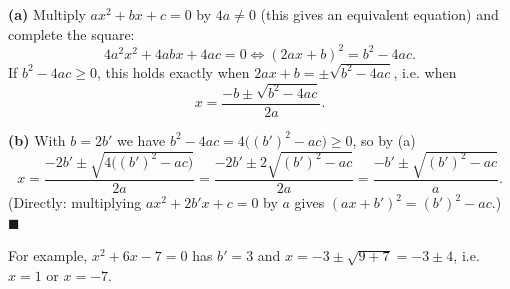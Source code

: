 \textbf{(a)} Multiply $ax^2+bx+c=0$ by $4a\ne0$ (this gives an equivalent equation) and complete the square:
\[4a^2x^2+4abx+4ac=0\iff(2ax+b)^2=b^2-4ac .\]
If $b^2-4ac\ge0$, this holds exactly when $2ax+b=\pm\sqrt{b^2-4ac}$, i.e. when
\[x=\dfrac{-b\pm\sqrt{b^2-4ac}}{2a}.\]

\textbf{(b)} With $b=2b'$ we have $b^2-4ac=4\bigl((b')^2-ac\bigr)\ge0$, so by (a)
\[x=\dfrac{-2b'\pm\sqrt{4\bigl((b')^2-ac\bigr)}}{2a}=\dfrac{-2b'\pm2\sqrt{(b')^2-ac}}{2a}=\dfrac{-b'\pm\sqrt{(b')^2-ac}}{a}.\]
(Directly: multiplying $ax^2+2b'x+c=0$ by $a$ gives $(ax+b')^2=(b')^2-ac$.) $\blacksquare$

For example, $x^2+6x-7=0$ has $b'=3$ and $x=-3\pm\sqrt{9+7}=-3\pm4$, i.e. $x=1$ or $x=-7$.
